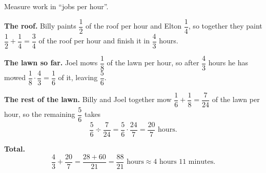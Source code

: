 Measure work in ``jobs per hour''.

\textbf{The roof.} Billy paints $\dfrac{1}{2}$ of the roof per hour and Elton $\dfrac{1}{4}$, so together they paint $\dfrac{1}{2}+\dfrac{1}{4}=\dfrac{3}{4}$ of the roof per hour and finish it in $\dfrac{4}{3}$ hours.

\textbf{The lawn so far.} Joel mows $\dfrac{1}{8}$ of the lawn per hour, so after $\dfrac{4}{3}$ hours he has mowed $\dfrac{1}{8}\cdot\dfrac{4}{3}=\dfrac{1}{6}$ of it, leaving $\dfrac{5}{6}$.

\textbf{The rest of the lawn.} Billy and Joel together mow $\dfrac{1}{6}+\dfrac{1}{8}=\dfrac{7}{24}$ of the lawn per hour, so the remaining $\dfrac{5}{6}$ takes
\[
\dfrac{5}{6}\div\dfrac{7}{24}=\dfrac{5}{6}\cdot\dfrac{24}{7}=\dfrac{20}{7}\text{ hours}.
\]

\textbf{Total.}
\[
\dfrac{4}{3}+\dfrac{20}{7}=\dfrac{28+60}{21}=\boxed{\dfrac{88}{21}\text{ hours}}\approx 4\text{ hours }11\text{ minutes}.
\]

